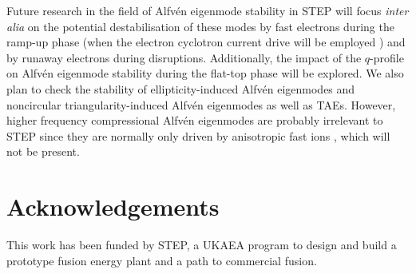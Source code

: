 \documentclass[10pt, a4paper, twoside]{article}
\begin{document}
Future research in the field of Alfv\'en eigenmode stability in STEP will focus {\it inter alia} on the potential destabilisation of these modes by fast electrons during the ramp-up phase (when the electron cyclotron current drive will be employed \cite{Henderson2024}) and by runaway electrons during disruptions. Additionally, the impact of the $q$-profile on Alfv\'en eigenmode stability during the flat-top phase will be explored. We also plan to check the stability of ellipticity-induced Alfv\'en eigenmodes and noncircular triangularity-induced Alfv\'en eigenmodes as well as TAEs. However, higher frequency compressional Alfv\'en eigenmodes are probably irrelevant to STEP since they are normally only driven by anisotropic fast ions \cite{Gorelenkov2016}, which will not be present. 




\section*{Acknowledgements}

This work has been funded by STEP, a UKAEA program to design and build a prototype fusion energy plant and a path to commercial fusion.
\end{document}
